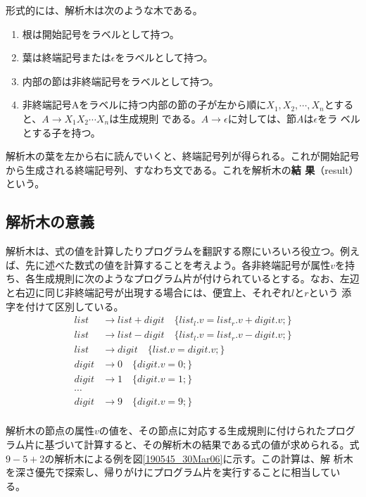 形式的には、解析木は次のような木である。
\begin{enumerate}
 \item 根は開始記号をラベルとして持つ。
 \item 葉は終端記号または$\epsilon$をラベルとして持つ。
 \item 内部の節は非終端記号をラベルとして持つ。
 \item 非終端記号Aをラベルに持つ内部の節の子が左から順に$X_1, X_2,
       \cdots, X_n$とすると、$A \rightarrow X_1 X_2 \cdots X_n$は生成規則
       である。$A \rightarrow \epsilon$に対しては、節$A$は$\epsilon$をラ
       ベルとする子を持つ。
\end{enumerate}

解析木の葉を左から右に読んでいくと、終端記号列が得られる。これが開始記号
から生成される終端記号列、すなわち文である。これを解析木の{\bfseries 結
果}（result）という。

\subsection{解析木の意義}

解析木は、式の値を計算したりプログラムを翻訳する際にいろいろ役立つ。例え
ば、先に述べた数式の値を計算することを考えよう。各非終端記号が属性$v$を持
ち、各生成規則に次のようなプログラム片が付けられているとする。なお、左辺
と右辺に同じ非終端記号が出現する場合には、便宜上、それぞれ$l$と$r$という
添字を付けて区別している。
\begin{align*}
 list & \rightarrow list + digit \quad \{ list_l.v = list_r.v + digit.v; \} \\
 list & \rightarrow list - digit \quad \{ list_l.v = list_r.v - digit.v; \} \\
 list & \rightarrow digit \quad \{ list.v = digit.v; \} \\
 digit & \rightarrow 0	\quad \{ digit.v = 0; \} \\
 digit & \rightarrow 1	\quad \{ digit.v = 1; \} \\
 \cdots \\
 digit & \rightarrow 9 \quad \{ digit.v = 9; \} \\
\end{align*}

解析木の節点の属性$v$の値を、その節点に対応する生成規則に付けられたプログ
ラム片に基づいて計算すると、その解析木の結果である式の値が求められる。式
$9 - 5 + 2$の解析木による例を図\ref{190545_30Mar06}に示す。この計算は、解
析木を深さ優先で探索し、帰りがけにプログラム片を実行することに相当してい
る。


